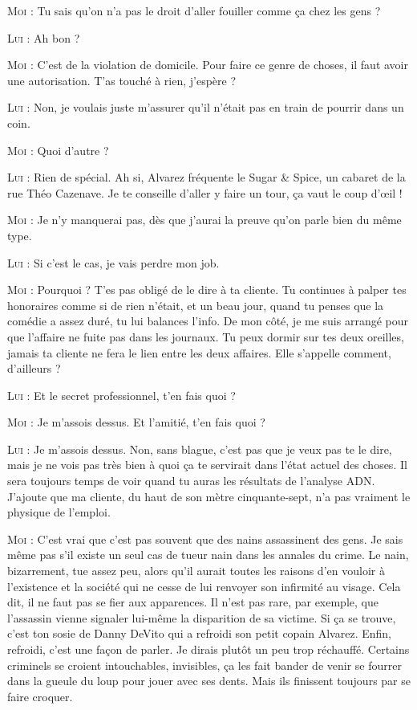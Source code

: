 \begin{dialogue}

\textsc{Moi} : Tu sais qu’on n’a pas le droit d’aller fouiller comme ça chez les gens ?

\textsc{Lui} : Ah bon ?

\textsc{Moi} : C’est de la violation de domicile. Pour faire ce genre de choses, il faut avoir une autorisation. T’as touché à rien, j’espère ?

\textsc{Lui} : Non, je voulais juste m’assurer qu’il n’était pas en train de pourrir dans un coin.

\textsc{Moi} : Quoi d’autre ?

\textsc{Lui} : Rien de spécial. Ah si, Alvarez fréquente le Sugar \& Spice, un cabaret de la rue Théo Cazenave. Je te conseille d’aller y faire un tour, ça vaut le coup d’œil !

\textsc{Moi} : Je n’y manquerai pas, dès que j’aurai la preuve qu’on parle bien du même type.

\textsc{Lui} : Si c’est le cas, je vais perdre mon job.

\textsc{Moi} : Pourquoi ? T’es pas obligé de le dire à ta cliente. Tu continues à palper tes honoraires comme si de rien n’était, et un beau jour, quand tu penses que la comédie a assez duré, tu lui balances l’info. De mon côté, je me suis arrangé pour que l’affaire ne fuite pas dans les journaux. Tu peux dormir sur tes deux oreilles, jamais ta cliente ne fera le lien entre les deux affaires. Elle s’appelle comment, d’ailleurs ?

\textsc{Lui} : Et le secret professionnel, t’en fais quoi ?

\textsc{Moi} : Je m’assois dessus. Et l’amitié, t’en fais quoi ?

\textsc{Lui} : Je m’assois dessus. Non, sans blague, c’est pas que je veux pas te le dire, mais je ne vois pas très bien à quoi ça te servirait dans l’état actuel des choses. Il sera toujours temps de voir quand tu auras les résultats de l’analyse ADN. J’ajoute que ma cliente, du haut de son mètre cinquante-sept, n’a pas vraiment le physique de l’emploi.

\textsc{Moi} : C’est vrai que c’est pas souvent que des nains assassinent des gens. Je sais même pas s’il existe un seul cas de tueur nain dans les annales du crime. Le nain, bizarrement, tue assez peu, alors qu’il aurait toutes les raisons d’en vouloir à l’existence et la société qui ne cesse de lui renvoyer son infirmité au visage. Cela dit, il ne faut pas se fier aux apparences. Il n’est pas rare, par exemple, que l’assassin vienne signaler lui-même la disparition de sa victime. Si ça se trouve, c’est ton sosie de Danny DeVito qui a refroidi son petit copain Alvarez. Enfin, refroidi, c’est une façon de parler. Je dirais plutôt un peu trop réchauffé. Certains criminels se croient intouchables, invisibles, ça les fait bander de venir se fourrer dans la gueule du loup pour jouer avec ses dents. Mais ils finissent toujours par se faire croquer.


\end{dialogue}
